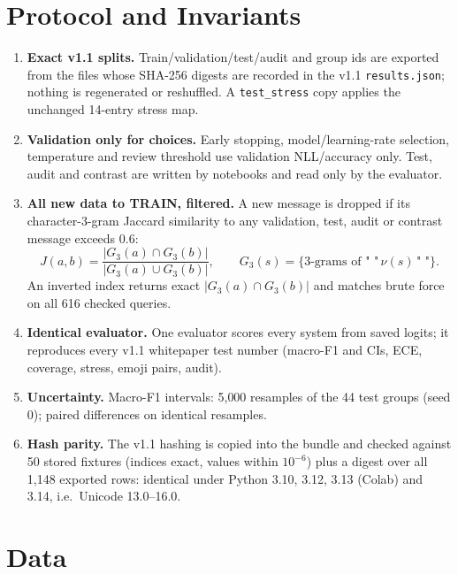 \documentclass[11pt,a4paper]{article}
\theoremstyle{remark}
\begin{document}
\section{Protocol and Invariants}
\label{sec:protocol}

\begin{enumerate}
  \item \textbf{Exact v1.1 splits.} Train/validation/test/audit and group ids are exported from the files whose SHA-256 digests are recorded in the v1.1 \texttt{results.json}; nothing is regenerated or reshuffled. A \texttt{test\_stress} copy applies the unchanged 14-entry stress map.
  \item \textbf{Validation only for choices.} Early stopping, model/learning-rate selection, temperature and review threshold use validation NLL/accuracy only. Test, audit and contrast are written by notebooks and read only by the evaluator.
  \item \textbf{All new data to TRAIN, filtered.} A new message is dropped if its character-3-gram Jaccard similarity to any validation, test, audit or contrast message exceeds $0.6$:
  \begin{equation}
    J(a,b) = \frac{|G_3(a)\cap G_3(b)|}{|G_3(a)\cup G_3(b)|},\qquad G_3(s)=\{\text{3-grams of } \texttt{"\ "}\,\nu(s)\,\texttt{"\ "}\}.
  \end{equation}
  An inverted index returns exact $|G_3(a)\cap G_3(b)|$ and matches brute force on all 616 checked queries.
  \item \textbf{Identical evaluator.} One evaluator scores every system from saved logits; it reproduces every v1.1 whitepaper test number (macro-F1 and CIs, ECE, coverage, stress, emoji pairs, audit).
  \item \textbf{Uncertainty.} Macro-F1 intervals: 5{,}000 resamples of the 44 test groups (seed 0); paired differences on identical resamples.
  \item \textbf{Hash parity.} The v1.1 hashing is copied into the bundle and checked against 50 stored fixtures (indices exact, values within $10^{-6}$) plus a digest over all 1{,}148 exported rows: identical under Python 3.10, 3.12, 3.13 (Colab) and 3.14, i.e.\ Unicode 13.0--16.0.
\end{enumerate}

\section{Data}
\label{sec:data}
\end{document}
